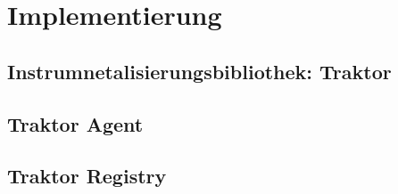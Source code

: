 %
\chapter{Implementierung}
\label{chapter:Bibliotheksentwicklung}
\section{Instrumnetalisierungsbibliothek: Traktor}
\label{section:Bibliothek: Traktor}
\section{Traktor Agent}
\label{section:Traktor Agent}

\section{Traktor Registry}
\label{section:Traktor Registry}

